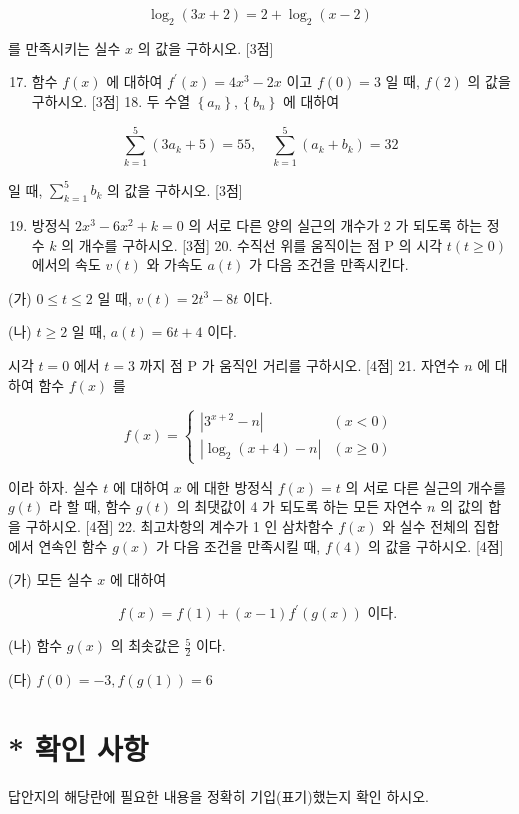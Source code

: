 \documentclass[10pt]{article}
\begin{document}
$$
\log _{2}(3 x+2)=2+\log _{2}(x-2)
$$

를 만족시키는 실수 $x$ 의 값을 구하시오. [3점]

\begin{enumerate}
  \setcounter{enumi}{16}
  \item 함수 $f(x)$ 에 대하여 $f^{\prime}(x)=4 x^{3}-2 x$ 이고 $f(0)=3$ 일 때, $f(2)$ 의 값을 구하시오. [3점] 18. 두 수열 $\left\{a_{n}\right\},\left\{b_{n}\right\}$ 에 대하여
\end{enumerate}

$$
\sum_{k=1}^{5}\left(3 a_{k}+5\right)=55, \quad \sum_{k=1}^{5}\left(a_{k}+b_{k}\right)=32
$$

일 때, $\sum_{k=1}^{5} b_{k}$ 의 값을 구하시오. [3점]

\begin{enumerate}
  \setcounter{enumi}{18}
  \item 방정식 $2 x^{3}-6 x^{2}+k=0$ 의 서로 다른 양의 실근의 개수가 2 가 되도록 하는 정수 $k$ 의 개수를 구하시오. [3점] 20. 수직선 위를 움직이는 점 $\mathrm{P}$ 의 시각 $t(t \geq 0)$ 에서의 속도 $v(t)$ 와 가속도 $a(t)$ 가 다음 조건을 만족시킨다.
\end{enumerate}

(가) $0 \leq t \leq 2$ 일 때, $v(t)=2 t^{3}-8 t$ 이다.

(나) $t \geq 2$ 일 때, $a(t)=6 t+4$ 이다.

시각 $t=0$ 에서 $t=3$ 까지 점 $\mathrm{P}$ 가 움직인 거리를 구하시오. [4점] 21. 자연수 $n$ 에 대하여 함수 $f(x)$ 를

$$
f(x)= \begin{cases}\left|3^{x+2}-n\right| & (x<0) \\ \left|\log _{2}(x+4)-n\right| & (x \geq 0)\end{cases}
$$

이라 하자. 실수 $t$ 에 대하여 $x$ 에 대한 방정식 $f(x)=t$ 의 서로 다른 실근의 개수를 $g(t)$ 라 할 때, 함수 $g(t)$ 의 최댓값이 4 가 되도록 하는 모든 자연수 $n$ 의 값의 합을 구하시오. [4점] 22. 최고차항의 계수가 1 인 삼차함수 $f(x)$ 와 실수 전체의 집합에서 연속인 함수 $g(x)$ 가 다음 조건을 만족시킬 때, $f(4)$ 의 값을 구하시오. [4점]

(가) 모든 실수 $x$ 에 대하여

$$
f(x)=f(1)+(x-1) f^{\prime}(g(x)) \text { 이다. }
$$

(나) 함수 $g(x)$ 의 최솟값은 $\frac{5}{2}$ 이다.

(다) $f(0)=-3, f(g(1))=6$

\section{* 확인 사항}
답안지의 해당란에 필요한 내용을 정확히 기입(표기)했는지 확인 하시오.
\end{document}

